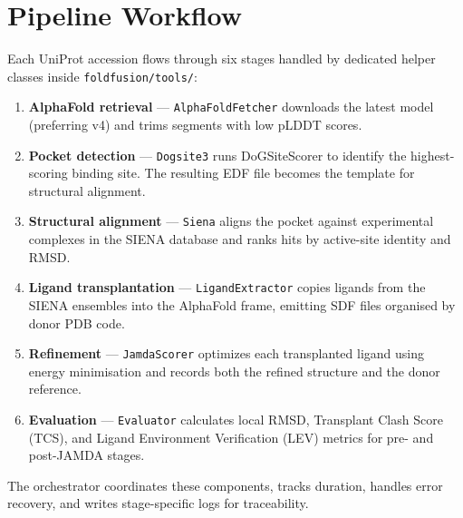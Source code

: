 \documentclass[11pt]{article}
\begin{document}
\section{Pipeline Workflow}
Each UniProt accession flows through six stages handled by dedicated helper
classes inside \texttt{foldfusion/tools/}:
\begin{enumerate}[noitemsep]
      \item \textbf{AlphaFold retrieval} --- \texttt{AlphaFoldFetcher} downloads the
            latest model (preferring v4) and trims segments with low pLDDT scores.
      \item \textbf{Pocket detection} --- \texttt{Dogsite3} runs DoGSiteScorer to
            identify the highest-scoring binding site. The resulting EDF file becomes
            the template for structural alignment.
      \item \textbf{Structural alignment} --- \texttt{Siena} aligns the pocket
            against experimental complexes in the SIENA database and ranks hits by
            active-site identity and RMSD.
      \item \textbf{Ligand transplantation} --- \texttt{LigandExtractor} copies
            ligands from the SIENA ensembles into the AlphaFold frame, emitting SDF
            files organised by donor PDB code.
      \item \textbf{Refinement} --- \texttt{JamdaScorer} optimizes each transplanted
            ligand using energy minimisation and records both the refined structure
            and the donor reference.
      \item \textbf{Evaluation} --- \texttt{Evaluator} calculates local RMSD,
            Transplant Clash Score (TCS), and Ligand Environment Verification (LEV)
            metrics for pre- and post-JAMDA stages.
\end{enumerate}

The orchestrator coordinates these components, tracks duration, handles error
recovery, and writes stage-specific logs for traceability.
\end{document}

